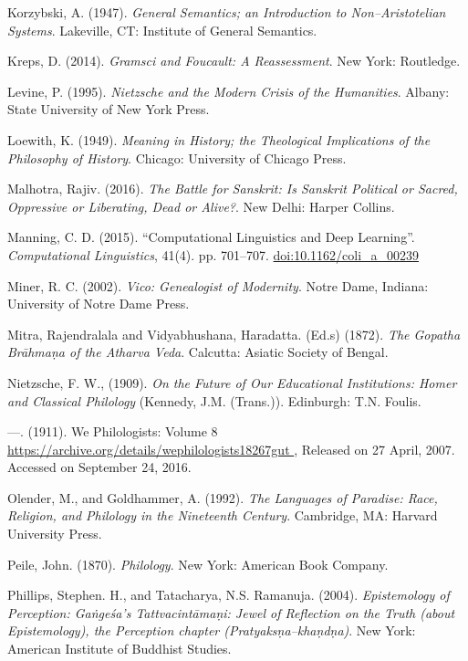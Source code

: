 \begin{thebibliography}{99}
  Korzybski, A. (1947). \textit{General Semantics; an Introduction to Non–Aristotelian Systems}. Lakeville, CT: Institute of General Semantics.

  Kreps, D. (2014). \textit{Gramsci and Foucault: A Reassessment}. New York: Routledge.

  Levine, P. (1995). \textit{Nietzsche and the Modern Crisis of the Humanities}. Albany: State University of New York Press.

  Loewith, K. (1949). \textit{Meaning in History; the Theological Implications of the Philosophy of History}. Chicago: University of Chicago Press.

  Malhotra, Rajiv. (2016). \textit{The Battle for Sanskrit: Is Sanskrit Political or Sacred, Oppressive or Liberating, Dead or Alive?}. New Delhi: Harper Collins.

  Manning, C. D. (2015). “Computational Linguistics and Deep Learning”. \textit{Computational Linguistics}, 41(4). pp. 701–707. \url{doi:10.1162/coli_a_00239}

  Miner, R. C. (2002). \textit{Vico: Genealogist of Modernity}. Notre Dame, Indiana: University of Notre Dame Press.

  Mitra, Rajendralala and Vidyabhushana, Haradatta. (Ed.s) (1872). \textit{The Gopatha Brāhmaṇa of the Atharva Veda}. Calcutta: Asiatic Society of Bengal.

  Nietzsche, F. W., (1909). \textit{On the Future of Our Educational Institutions: Homer and Classical Philology} (Kennedy, J.M. (Trans.)). Edinburgh: T.N. Foulis.

  —. (1911). We Philologists: Volume 8 \url{ https://archive.org/details/wephilologists18267gut }, Released on 27 April, 2007. Accessed on September 24, 2016.

  Olender, M., and Goldhammer, A. (1992). \textit{The Languages of Paradise: Race, Religion, and Philology in the Nineteenth Century}. Cambridge, MA: Harvard University Press.

  Peile, John. (1870). \textit{Philology}. New York: American Book Company.

  Phillips, Stephen. H., and Tatacharya, N.S. Ramanuja. (2004). \textit{Epistemology of Perception: Gaṅgeśa's Tattvacintāmaṇi: Jewel of Reflection on the Truth (about Epistemology), the Perception chapter (Pratyaksṇa–khaṇdṇa)}. New York: American Institute of Buddhist Studies.


\end{thebibliography}
